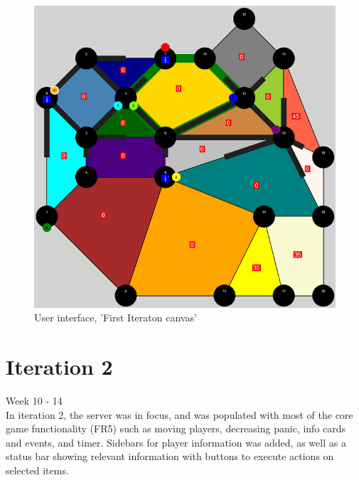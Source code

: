 \begin{figure}[H]
  \centering
    \includegraphics[width=1.0\textwidth]{img/canvas.png}
  \caption{User interface, 'First Iteraton canvas'} 
  \label{fig:canvas}
\end{figure}


\section{Iteration 2}

Week 10 - 14\\
\newline
In iteration 2, the server was in focus, and was populated with most of the core game functionality (FR5) such as moving players, decreasing panic, info cards and events, and timer. Sidebars for player information was added, as well as a status bar showing relevant information with buttons to execute actions on selected items.\\

